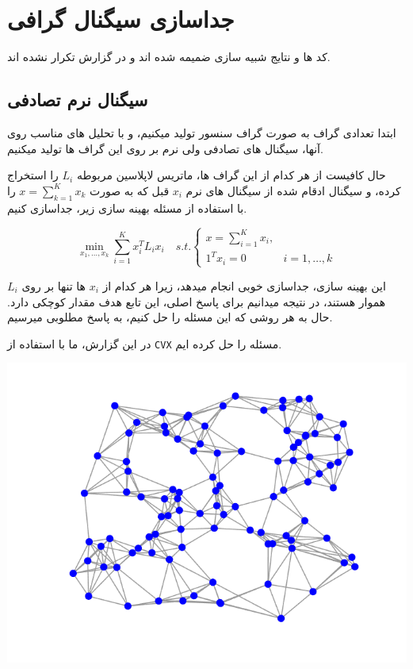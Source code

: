 \section{جداسازی سیگنال گرافی}

کد ها و نتایج شبیه سازی ضمیمه شده اند و در گزارش تکرار نشده اند.

\subsection{سیگنال نرم تصادفی}

ابتدا تعدادی گراف به صورت گراف سنسور تولید میکنیم، و با تحلیل های مناسب روی آنها، سیگنال های تصادفی ولی نرم بر روی این گراف ها تولید میکنیم.

\begin{minipage}{0.6\linewidth}
	حال کافیست از هر کدام از این گراف ها، ماتریس لاپلاسین مربوطه $L_i$ را استخراج کرده، و سیگنال ادقام شده از سیگنال های نرم
	$x_i$ قبل که به صورت $x=\sum_{k=1}^{K}x_k$ را با استفاده از مسئله بهینه سازی زیر، جداسازی کنیم.

	\[
		\min_{x_1,\dots,x_k}\sum_{i=1}^{K} x_i^TL_ix_i\quad
		s.t.\begin{cases}
			x=\sum_{i=1}^{K}x_i,   \\
			1^Tx_i=0 & i=1,\dots,k
		\end{cases}
	\]

	این بهینه سازی، جداسازی خوبی انجام میدهد، زیرا هر کدام از $x_i$ ها تنها بر روی $L_i$ هموار هستند، در نتیجه میدانیم برای پاسخ اصلی، این تابع هدف مقدار کوچکی دارد.
	حال به هر روشی که این مسئله را حل کنیم، به پاسخ مطلوبی میرسیم.

	در این گزارش، ما با استفاده از \texttt{CVX} مسئله را حل کرده ایم.
\end{minipage}
\begin{minipage}{0.4\linewidth}
	\centering
	\includegraphics*[width=\linewidth]{../results/sample_sensor_graph.png}
\end{minipage}
\vspace*{1em}

